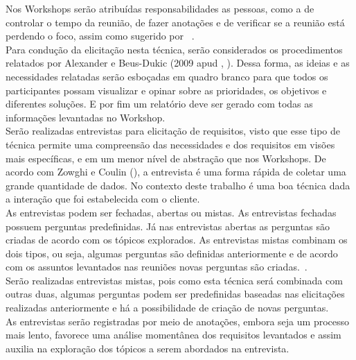 Nos Workshops serão atribuídas responsabilidades as pessoas, como a de controlar o tempo da reunião, de fazer anotações e de verificar se a reunião está perdendo o foco, assim como sugerido por ~\cite{falbo}. \\

Para condução da elicitação nesta técnica, serão considerados os procedimentos relatados por Alexander e Beus-Dukic (2009 apud   \citeauthor{falbo}, \citeyear{falbo}). Dessa forma, as ideias e as necessidades relatadas serão esboçadas em quadro branco para que todos os participantes possam visualizar e opinar sobre as prioridades, os objetivos e diferentes soluções. E por fim um relatório deve ser gerado com todas as informações levantadas no Workshop.\\

Serão realizadas entrevistas para elicitação de requisitos, visto que esse tipo de técnica permite uma compreensão das necessidades e dos requisitos em visões mais específicas, e em um menor nível de abstração que nos Workshops. 
De acordo com Zowghi e Coulin (\citeyear{coulin}), a entrevista é uma forma rápida de coletar uma grande quantidade de dados. No contexto deste trabalho é uma boa técnica dada a interação que foi estabelecida com o cliente.\\

As entrevistas podem ser fechadas, abertas ou mistas. As entrevistas fechadas possuem perguntas predefinidas. Já nas entrevistas abertas as perguntas são criadas de acordo com os tópicos explorados. As entrevistas mistas combinam os dois tipos, ou seja, algumas perguntas são definidas anteriormente e de acordo com os assuntos levantados nas reuniões novas perguntas são criadas.~\cite{sommerville}.\\

Serão realizadas entrevistas mistas, pois como esta técnica será combinada com outras duas, algumas perguntas podem ser predefinidas baseadas nas elicitações realizadas anteriormente e há a possibilidade de criação de novas perguntas.\\

As entrevistas serão registradas por meio de anotações, embora seja um processo mais lento, favorece uma análise momentânea dos requisitos levantados e assim auxilia na exploração dos tópicos a serem abordados na entrevista.\\

